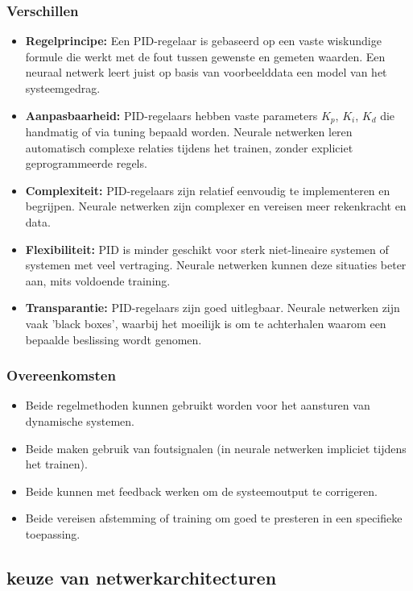 \subsubsection{Verschillen}
\begin{itemize}
  \item \textbf{Regelprincipe:} Een PID-regelaar is gebaseerd op een vaste wiskundige formule die werkt met de fout tussen gewenste en gemeten waarden. Een neuraal netwerk leert juist op basis van voorbeelddata een model van het systeemgedrag.
  \item \textbf{Aanpasbaarheid:} PID-regelaars hebben vaste parameters \(K_p\), \(K_i\), \(K_d\) die handmatig of via tuning bepaald worden. Neurale netwerken leren automatisch complexe relaties tijdens het trainen, zonder expliciet geprogrammeerde regels. 
  \item \textbf{Complexiteit:} PID-regelaars zijn relatief eenvoudig te implementeren en begrijpen. Neurale netwerken zijn complexer en vereisen meer rekenkracht en data.
  \item \textbf{Flexibiliteit:} PID is minder geschikt voor sterk niet-lineaire systemen of systemen met veel vertraging. Neurale netwerken kunnen deze situaties beter aan, mits voldoende training.
  \item \textbf{Transparantie:} PID-regelaars zijn goed uitlegbaar. Neurale netwerken zijn vaak 'black boxes', waarbij het moeilijk is om te achterhalen waarom een bepaalde beslissing wordt genomen.
\end{itemize}
\subsubsection{Overeenkomsten}
\begin{itemize}
  \item Beide regelmethoden kunnen gebruikt worden voor het aansturen van dynamische systemen.
  \item Beide maken gebruik van foutsignalen (in neurale netwerken impliciet tijdens het trainen).
  \item Beide kunnen met feedback werken om de systeemoutput te corrigeren.
  \item Beide vereisen afstemming of training om goed te presteren in een specifieke toepassing.
\end{itemize}







\subsection{keuze van netwerkarchitecturen }



